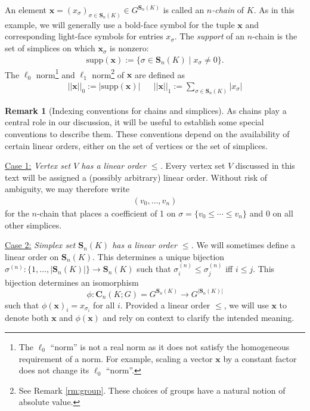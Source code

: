 \documentclass[11pt,onecolumn]{article}
\newcommand{\Chains}{\mathbf{C}}
\newcommand{\Simplices}[0]{\mathbf{S}}
\newcommand{\optimalrep}{\mathbf{x}}
\newcommand{\orepentry}{x}
\newcommand{\supp}{\mathrm{supp}}
\newcommand{\dimss}[1]{^{(#1)}}
\theoremstyle{plain}
\theoremstyle{definition}
\newtheorem{remark}[theorem]{Remark}
\begin{document}
An element $\optimalrep = (\orepentry_\sigma)_{\sigma \in \Simplices_n(K)} \in G^{\Simplices_n(K)}$ is called an \emph{$n$-chain} of $K$.   As  in this example, we will generally use a bold-face symbol for the tuple $\optimalrep$ and corresponding light-face symbols for entries $\orepentry_\sigma$.  The \emph{support} of an $n$-chain is the set of simplices on which $\optimalrep_\sigma$ is nonzero:  
%
    \begin{align*}
        \supp(\optimalrep)  :=\{ \sigma \in \Simplices_n(K) \mid \orepentry_\sigma \neq 0 \}.
    \end{align*}
%
The $\ell_0$ norm\footnote{The $\ell_0$ ``norm'' is not a real norm as it does not satisfy the homogeneous requirement of a norm. For example, scaling a vector $\optimalrep$ by a constant factor does not change its $\ell_0$ ``norm''.} and  $\ell_1$ norm\footnote{ See Remark \ref{rm:group}. These choices of groups have a natural notion of absolute value.} of $\optimalrep$ are defined as 
    \begin{align*}
        ||\optimalrep||_0 := |\supp(\optimalrep) |
        &&
        \textstyle
        ||\optimalrep||_1 := \sum_{ \sigma \in \Simplices_n(K)} | \orepentry_\sigma  |
    \end{align*}

\begin{remark}[{Indexing conventions for chains and simplices}]
\label{rmk:indexingchains}
As chains play a central role in our discussion, it will be useful to establish some special conventions to describe them.  These conventions depend on the availability of certain linear orders, either on the set of vertices or the set of simplices.

\noindent \underline{Case 1:} \emph{Vertex set $V$ has a linear order $\le$. }  Every vertex set $V$ discussed in this text will be assigned a (possibly arbitrary) linear order.  Without  risk of ambiguity, we may therefore write
    \begin{align*}
        (v_0, \ldots, v_n)
    \end{align*}
for the $n$-chain that places a coefficient of 1 on $\sigma = \{v_0 \leq \cdots \leq v_n\}$ and 0 on all other simplices. 

\noindent \underline{Case 2:} \emph{Simplex set $\Simplices_n(K)$ has a linear order $\le$.}  We will sometimes define a linear order on $\Simplices_n(K)$.  This determines a unique bijection  $\sigma \dimss{n}: \{1, \ldots, |\Simplices_n(K)|\} \to  \Simplices_n(K)$ such that $\sigma_i\dimss{n} \le \sigma_j\dimss{n}$ iff $i \le j$.  This bijection determines an isomorphism
    $$
        \phi: 
        \Chains_n(K;G) = G^{\Simplices_n(K)}
        \to
        G^{|\Simplices_n(K)|}
    $$
such that $\phi(\optimalrep)_i = \orepentry_{\sigma_i}$ for all $i$.  
Provided a linear order $\le$,  we will use $\optimalrep$ to denote both $\optimalrep$ and $\phi(\optimalrep)$ and rely on context to clarify the  intended meaning.
\end{remark}
\end{document}
